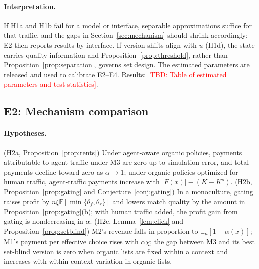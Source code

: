 \documentclass[opre,dblanonrev]{informs4}
\providecommand{\E}{\mathbb{E}}
\providecommand{\1}{\mathbf{1}}
\providecommand{\TBD}[1]{\textcolor{red}{[TBD: #1]}}
\begin{document}
\paragraph{Interpretation.} If H1a and H1b fail for a model or interface, separable approximations suffice for that traffic, and the gaps in Section~\ref{sec:mechanism} should shrink accordingly; E2 then reports results by interface. If version shifts align with $u$ (H1d), the state carries quality information and Proposition~\ref{prop:threshold}, rather than Proposition~\ref{prop:separation}, governs set design. The estimated parameters are released and used to calibrate E2--E4. Results: \TBD{Table of estimated parameters and test statistics}.

\subsection{E2: Mechanism comparison}\label{sec:exp-mechanism}

\paragraph{Hypotheses.} (H2a, Proposition~\ref{prop:rents}) Under agent-aware organic policies, payments attributable to agent traffic under M3 are zero up to simulation error, and total payments decline toward zero as $\alpha\to1$; under organic policies optimized for human traffic, agent-traffic payments increase with $|F(x)|-(K-K^s)$. (H2b, Proposition~\ref{prop:gating} and Conjecture~\ref{conj:gating}) In a monoculture, gating raises profit by $n\xi\E[\min\{\theta_f,\theta_r\}]$ and lowers match quality by the amount in Proposition~\ref{prop:gating}(b); with human traffic added, the profit gain from gating is nondecreasing in $\alpha$. (H2c, Lemma~\ref{lem:click} and Proposition~\ref{prop:setblind}) M2's revenue falls in proportion to $\E_\mu[1-\alpha(x)]$; M1's payment per effective choice rises with $\alpha\bar\chi$; the gap between M3 and its best set-blind version is zero when organic lists are fixed within a context and increases with within-context variation in organic lists.
\end{document}
